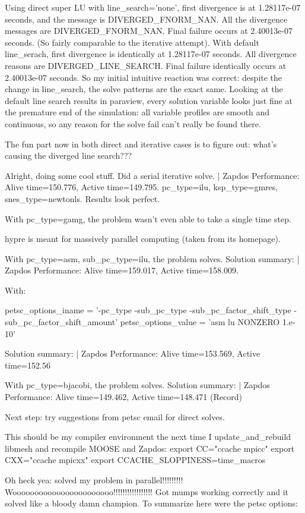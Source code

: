 Using direct super LU with line_search='none', first divergence is at 1.28117e-07 seconds, and the message is DIVERGED_FNORM_NAN. All the divergence messages are DIVERGED_FNORM_NAN. Final failure occurs at 2.40013e-07 seconds. (So fairly comparable to the iterative attempt). With default line_serach, first divergence is identically at 1.28117e-07 seconds. All divergence reasons are DIVERGED_LINE_SEARCH. Final failure identically occurs at 2.40013e-07 seconds. So my initial intuitive reaction was correct: despite the change in line_search, the solve patterns are the exact same. Looking at the default line search results in paraview, every solution variable looks just fine at the premature end of the simulation: all variable profiles are smooth and continuous, so any reason for the solve fail can't really be found there.

The fun part now in both direct and iterative cases is to figure out: what's causing the diverged line search???

Alright, doing some cool stuff. Did a serial iterative solve. | Zapdos Performance: Alive time=150.776, Active time=149.795. pc_type=ilu, ksp_type=gmres, snes_type=newtonls. Results look perfect.

With pc_type=gamg, the problem wasn't even able to take a single time step.

hypre is meant for massively parallel computing (taken from its homepage).

With pc_type=asm, sub_pc_type=ilu, the problem solves. Solution summary: | Zapdos Performance: Alive time=159.017, Active time=158.009.

With:

  petsc_options_iname = '-pc_type -sub_pc_type -sub_pc_factor_shift_type -sub_pc_factor_shift_amount'
  petsc_options_value = 'asm lu NONZERO 1.e-10'

Solution summary: | Zapdos Performance: Alive time=153.569, Active time=152.56

With pc_type=bjacobi, the problem solves. Solution summary: | Zapdos Performance: Alive time=149.462, Active time=148.471 (Record)

Next step: try suggestions from petsc email for direct solves.

This should be my compiler environment the next time I update_and_rebuild libmesh and recompile MOOSE and Zapdos:
export CC="ccache mpicc"
export CXX="ccache mpicxx"
export CCACHE_SLOPPINESS=time_macros

Oh heck yea: solved my problem in parallel!!!!!!!!! Wooooooooooooooooooooooo!!!!!!!!!!!!!!!!! Got mumps working correctly and it solved like a bloody damn champion. To summarize here were the petsc options:

